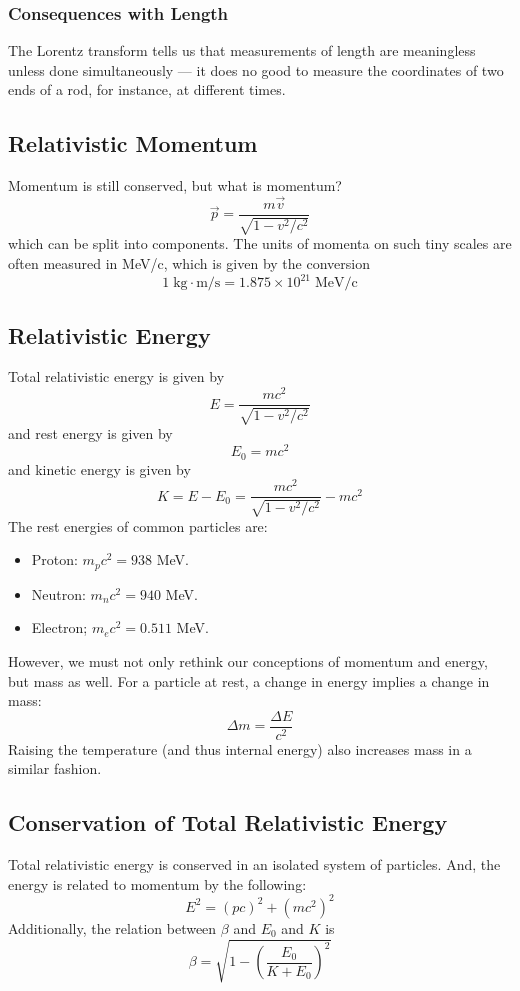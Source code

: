 \documentclass[../PhysicsFormulae.tex]{subfiles}
\begin{document}
\subsubsection{Consequences with Length}
The Lorentz transform tells us that measurements of length are meaningless unless done simultaneously — it does no good to measure the coordinates of two ends of a rod, for instance, at different times. 

\subsection{Relativistic Momentum}
Momentum is still conserved, but what is momentum?
\[ \vec{p} = \frac{m\vec{v}}{\sqrt{1 - v^2/c^2}} \]
which can be split into components. The units of momenta on such tiny scales are often measured in MeV/c, which is given by the conversion
\[ 1\;\textrm{kg}\cdot\textrm{m/s} = 1.875 \times 10^{21} \; \textrm{MeV/c} \]
\subsection{Relativistic Energy}
Total relativistic energy is given by
\[ E = \frac{mc^2}{\sqrt{1-v^2/c^2}} \]
and rest energy is given by 
\[ E_0 = mc^2 \]
and kinetic energy is given by 
\[ K = E - E_0 = \frac{mc^2}{\sqrt{1-v^2/c^2}} - mc^2 \]
The rest energies of common particles are: 
\begin{itemize}
\item Proton: $m_pc^2 = 938$ MeV. 
\item Neutron: $m_nc^2 = 940$ MeV. 
\item Electron; $m_ec^2 = 0.511$ MeV.
\end{itemize}
However, we must not only rethink our conceptions of momentum and energy, but mass as well. For a particle at rest, a change in energy implies a change in mass: 
\[ \Delta m = \frac{\Delta E}{c^2} \]
Raising the temperature (and thus internal energy) also increases mass in a similar fashion. 
\subsection{Conservation of Total Relativistic Energy}
Total relativistic energy is conserved in an isolated system of particles. And, the energy is related to momentum by the following: 
\[ E^2 = (pc)^2 + (mc^2)^2 \]
Additionally, the relation between $\beta$ and $E_0$ and $K$ is
\[ \beta = \sqrt{1 - \left(\frac{E_0}{K+E_0}\right)^2} \]
\end{document}
